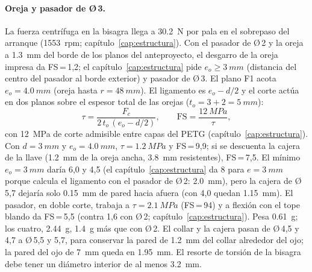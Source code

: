 \paragraph{Oreja y pasador de Ø\,3.} La fuerza centrífuga en la bisagra llega a \SI{30.2}{N} por pala
en el sobrepaso del arranque (\num{1553}~rpm; capítulo~\ref{cap:estructura}). Con el pasador de Ø\,2 y la
oreja a \SI{1.3}{mm} del borde de los planos del anteproyecto, el desgarro de la oreja impresa da
FS\,=\,1,2; el capítulo~\ref{cap:estructura} pide $e_o\ge\SI{3}{mm}$ (distancia del centro del pasador al
borde exterior) y pasador de Ø\,3. El plano F1 acota $e_o=\SI{4.0}{mm}$ (oreja hasta $r=\SI{48}{mm}$). El
ligamento es $e_o-d/2$ y el corte actúa en dos planos sobre el espesor total de las orejas
($t_o=3+2=\SI{5}{mm}$):
\begin{equation}
  \tau=\frac{F_c}{2\,t_o\,(e_o-d/2)},\qquad \mathrm{FS}=\frac{\SI{12}{MPa}}{\tau},
  \label{eq:fabricacion-oreja}
\end{equation}
con \SI{12}{MPa} de corte admisible entre capas del PETG (capítulo~\ref{cap:estructura}). Con $d=\SI{3}{mm}$ y
$e_o=\SI{4.0}{mm}$, $\tau=\SI{1.2}{MPa}$ y FS\,=\,9,9; si se descuenta la cajera de la llave
(\SI{1.2}{mm} de la oreja ancha, \SI{3.8}{mm} resistentes), FS\,=\,7,5. El mínimo $e_o=\SI{3}{mm}$ daría 6,0 y
4,5 (el capítulo~\ref{cap:estructura} da 8 para $e=\SI{3}{mm}$ porque calcula el ligamento con el pasador
de Ø\,2: \SI{2.0}{mm}), pero la cajera de Ø\,5,7 dejaría solo \SI{0.15}{mm} de pared hacia afuera (con 4,0 quedan \SI{1.15}{mm}).
El pasador, en doble corte, trabaja a $\tau=\SI{2.1}{MPa}$ (FS\,=\,94) y a flexión con el tope blando da
FS\,=\,5,5 (contra 1,6 con Ø\,2; capítulo~\ref{cap:estructura}). Pesa \SI{0.61}{g}; los cuatro,
\SI{2.44}{g}, \SI{1.4}{g} más que con Ø\,2. El collar y la cajera pasan de Ø\,4,5 y 4,7 a Ø\,5,5 y 5,7, para
conservar la pared de \SI{1.2}{mm} del collar alrededor del ojo; la pared del ojo de \SI{7}{mm} queda en
\SI{1.95}{mm}. El resorte de torsión de la bisagra debe tener un diámetro interior de al menos \SI{3.2}{mm}.

